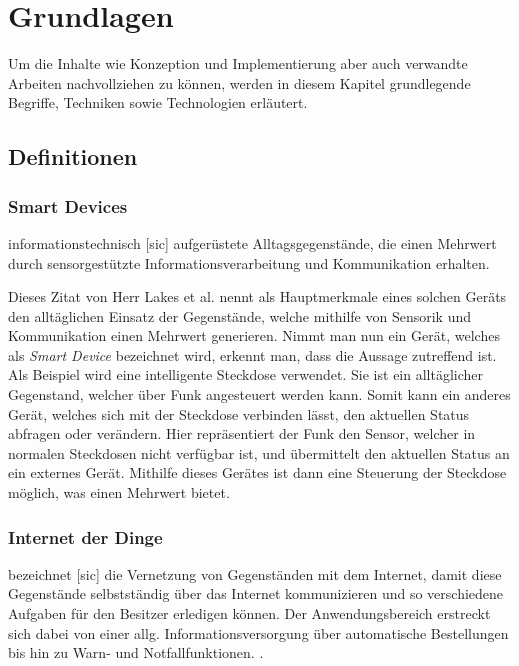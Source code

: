 \chapter{Grundlagen}
Um die Inhalte wie Konzeption und Implementierung aber auch verwandte Arbeiten nachvollziehen zu können, werden in diesem Kapitel grundlegende Begriffe, Techniken sowie Technologien erläutert.

\section{Definitionen}
    \subsection{Smart Devices} \label{SmartDevices}
        \glqq informationstechnisch [sic] aufgerüstete Alltagsgegenstände, die einen Mehrwert durch sensorgestützte Informationsverarbeitung und Kommunikation erhalten.\grqq{} \cite{lackes_siepermann_2018}
        
        Dieses Zitat von Herr Lakes et al. nennt als Hauptmerkmale eines solchen Geräts den alltäglichen Einsatz der Gegenstände, welche mithilfe von Sensorik und Kommunikation einen Mehrwert generieren.
        Nimmt man nun ein Gerät, welches als \emph{Smart Device} bezeichnet wird, erkennt man, dass die Aussage zutreffend ist. Als Beispiel wird eine intelligente Steckdose verwendet. Sie ist ein alltäglicher Gegenstand, welcher über Funk angesteuert werden kann. Somit kann ein anderes Gerät, welches sich mit der Steckdose verbinden lässt, den aktuellen Status abfragen oder verändern.
        Hier repräsentiert der Funk den Sensor, welcher in normalen Steckdosen nicht verfügbar ist, und übermittelt den aktuellen Status an ein externes Gerät. Mithilfe dieses Gerätes ist dann eine Steuerung der Steckdose möglich, was einen Mehrwert bietet.
    
    \subsection{Internet der Dinge}
        \glqq bezeichnet [sic] die Vernetzung von Gegenständen mit dem Internet, damit diese Gegenstände selbstständig über das Internet kommunizieren und so verschiedene Aufgaben für den Besitzer erledigen können. Der Anwendungsbereich erstreckt sich dabei von einer allg. Informationsversorgung über automatische Bestellungen bis hin zu Warn- und Notfallfunktionen.\grqq{}
        \cite{lackes_siepermann_2018_iot}.
    

